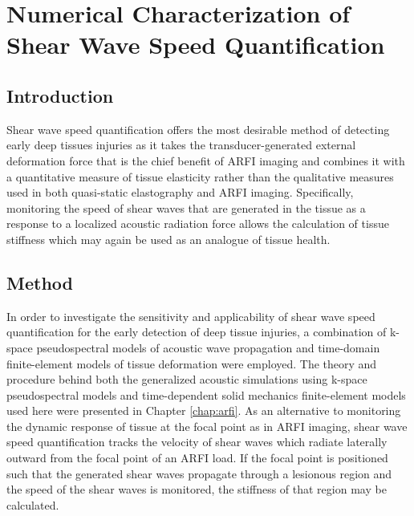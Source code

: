 \chapter{Numerical Characterization of Shear Wave Speed Quantification}
	\label{chap:shear}
	\section{Introduction}
		Shear wave speed quantification offers the most desirable method of detecting early deep tissues injuries as it takes the transducer-generated external deformation force that is the chief benefit of ARFI imaging and combines it with a quantitative measure of tissue elasticity rather than the qualitative measures used in both quasi-static elastography and ARFI imaging. Specifically, monitoring the speed of shear waves that are generated in the tissue as a response to a localized acoustic radiation force allows the calculation of tissue stiffness which may again be used as an analogue of tissue health.

	\section{Method}
		In order to investigate the sensitivity and applicability of shear wave speed quantification for the early detection of deep tissue injuries, a combination of k-space pseudospectral models of acoustic wave propagation and time-domain finite-element models of tissue deformation were employed. The theory and procedure behind both the generalized acoustic simulations using k-space pseudospectral models and time-dependent solid mechanics finite-element models used here were presented in Chapter \ref{chap:arfi}. As an alternative to monitoring the dynamic response of tissue at the focal point as in ARFI imaging, shear wave speed quantification tracks the velocity of shear waves which radiate laterally outward from the focal point of an ARFI load. If the focal point is positioned such that the generated shear waves propagate through a lesionous region and the speed of the shear waves is monitored, the stiffness of that region may be calculated.





